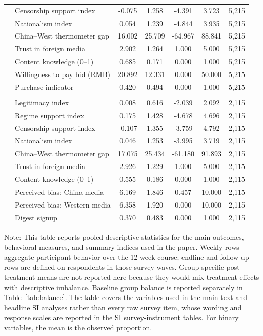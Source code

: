 \begin{table}[H]
\begin{threeparttable}
\begin{tabular}{llccccc}
& Censorship support index & -0.075 & 1.258 & -4.391 & 3.723 & 5,215 \\
& Nationalism index & 0.054 & 1.239 & -4.844 & 3.935 & 5,215 \\
& China--West thermometer gap & 16.002 & 25.709 & -64.967 & 88.841 & 5,215 \\
& Trust in foreign media & 2.902 & 1.264 & 1.000 & 5.000 & 5,215 \\
& Content knowledge (0--1) & 0.685 & 0.171 & 0.000 & 1.000 & 5,215 \\
& Willingness to pay bid (RMB) & 20.892 & 12.331 & 0.000 & 50.000 & 5,215 \\
& Purchase indicator & 0.420 & 0.494 & 0.000 & 1.000 & 5,215 \\
\addlinespace
\multicolumn{7}{l}{\textit{Follow-up respondents}} \\
& Legitimacy index & 0.008 & 0.616 & -2.039 & 2.092 & 2,115 \\
& Regime support index & 0.175 & 1.428 & -4.678 & 4.696 & 2,115 \\
& Censorship support index & -0.107 & 1.355 & -3.759 & 4.792 & 2,115 \\
& Nationalism index & 0.046 & 1.253 & -3.995 & 3.719 & 2,115 \\
& China--West thermometer gap & 17.075 & 25.434 & -61.180 & 91.893 & 2,115 \\
& Trust in foreign media & 2.926 & 1.229 & 1.000 & 5.000 & 2,115 \\
& Content knowledge (0--1) & 0.555 & 0.186 & 0.000 & 1.000 & 2,115 \\
& Perceived bias: China media & 6.169 & 1.846 & 0.457 & 10.000 & 2,115 \\
& Perceived bias: Western media & 6.358 & 1.920 & 0.000 & 10.000 & 2,115 \\
& Digest signup & 0.370 & 0.483 & 0.000 & 1.000 & 2,115 \\
\bottomrule
\end{tabular}
\begin{tablenotes}[flushleft]
\footnotesize
\item Note: This table reports pooled descriptive statistics for the main outcomes, behavioral measures, and summary indices used in the paper. Weekly rows aggregate participant behavior over the 12-week course; endline and follow-up rows are defined on respondents in those survey waves. Group-specific post-treatment means are not reported here because they would mix treatment effects with descriptive imbalance. Baseline group balance is reported separately in Table~\ref{tab:balance}. The table covers the variables used in the main text and headline SI analyses rather than every raw survey item, whose wording and response scales are reported in the SI survey-instrument tables. For binary variables, the mean is the observed proportion.
\end{tablenotes}
\end{threeparttable}
\end{table}
